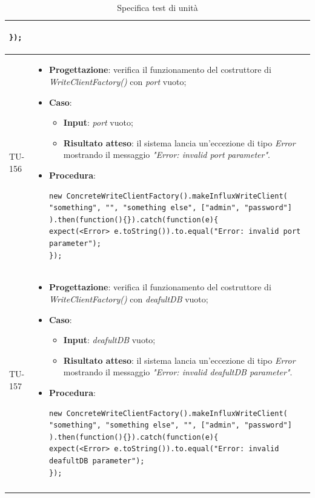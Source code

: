 \begin{longtable}{|C{1.5cm}|C{14.5cm}|}
\begin{itemize}
\begin{lstlisting}
});
	\end{lstlisting}
\end{itemize}\\
\hline
{TU-156} &
\begin{itemize}
	\item \textbf{Progettazione}: verifica il funzionamento del costruttore di \emph{WriteClientFactory()} con \emph{port} vuoto;
	\item \textbf{Caso}: 
	\begin{itemize}
		\item \textbf{Input}: \emph{port} vuoto;
		\item \textbf{Risultato atteso}: il sistema lancia un'eccezione di tipo \emph{Error} mostrando il messaggio \emph{"Error: invalid port parameter"}.
	\end{itemize}
	\item \textbf{Procedura}:
	\begin{lstlisting}
new ConcreteWriteClientFactory().makeInfluxWriteClient(
"something", "", "something else", ["admin", "password"]
).then(function(){}).catch(function(e){
expect(<Error> e.toString()).to.equal("Error: invalid port parameter");
});
	\end{lstlisting}
\end{itemize}\\
\hline
{TU-157} &
\begin{itemize}
	\item \textbf{Progettazione}: verifica il funzionamento del costruttore di \emph{WriteClientFactory()} con \emph{deafultDB} vuoto;
	\item \textbf{Caso}: 
	\begin{itemize}
		\item \textbf{Input}: \emph{deafultDB} vuoto;
		\item \textbf{Risultato atteso}: il sistema lancia un'eccezione di tipo \emph{Error} mostrando il messaggio \emph{"Error: invalid deafultDB parameter"}.
	\end{itemize}
	\item \textbf{Procedura}:
	\begin{lstlisting}
new ConcreteWriteClientFactory().makeInfluxWriteClient(
"something", "something else", "", ["admin", "password"]
).then(function(){}).catch(function(e){
expect(<Error> e.toString()).to.equal("Error: invalid deafultDB parameter");
});
	\end{lstlisting}
\end{itemize}\\
\hline
	\caption{Specifica test di unità}
	\label{tabella:specifica tu}
\end{longtable}
\renewcommand{\arraystretch}{1}
\newpage


